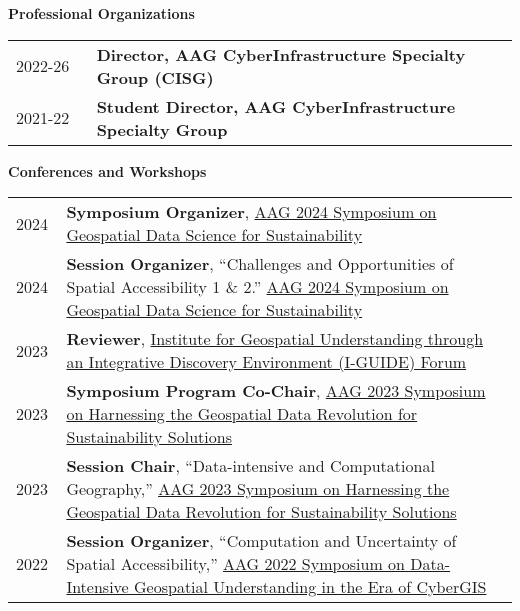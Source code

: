 \documentclass{acmcv}
\begin{document}


\vspace*{0.25cm}

    \textbf{Professional Organizations}
    \begin{longtable}{p{0.16\linewidth} p{0.84\linewidth}}

        2022-26 & \textbf{Director, AAG CyberInfrastructure Specialty Group (CISG)} \\

        2021-22 & \textbf{Student Director, AAG CyberInfrastructure Specialty Group}
    \end{longtable}

    \textbf{Conferences and Workshops}
    \begin{longtable}{p{0.1\linewidth} p{0.9\linewidth}}
        2024 & \textbf{Symposium Organizer}, \href{https://iguide.illinois.edu/aag-2024-symposium-on-geospatial-data-science-for-sustainability/}{AAG 2024 Symposium on Geospatial Data Science for Sustainability}\\

        2024 & \textbf{Session Organizer}, ``Challenges and Opportunities of Spatial Accessibility 1 \& 2.'' \href{https://iguide.illinois.edu/aag-2024-symposium-on-geospatial-data-science-for-sustainability/}{AAG 2024 Symposium on Geospatial Data Science for Sustainability}\\
        
        2023 & \textbf{Reviewer}, \href{https://iguide.illinois.edu/forum-2023/}{Institute for Geospatial Understanding through an Integrative Discovery Environment (I-GUIDE) Forum}\\

        2023 & \textbf{Symposium Program Co-Chair}, \href{https://iguide.illinois.edu/aag-2023-symposium-on-harnessing-the-geospatial-data-revolution-for-sustainability-solutions/}{AAG 2023 Symposium on Harnessing the Geospatial Data Revolution for Sustainability Solutions}\\

        2023 & \textbf{Session Chair}, ``Data-intensive and Computational Geography,'' \href{https://iguide.illinois.edu/aag-2023-symposium-on-harnessing-the-geospatial-data-revolution-for-sustainability-solutions/}{AAG 2023 Symposium on Harnessing the Geospatial Data Revolution for Sustainability Solutions}\\

        2022 & \textbf{Session Organizer}, ``Computation and Uncertainty of Spatial Accessibility,'' \href{https://cybergis.illinois.edu/aag-symposium-2022/}{AAG 2022 Symposium on Data-Intensive Geospatial Understanding in the Era of CyberGIS}\\
    \end{longtable}
\end{document}
